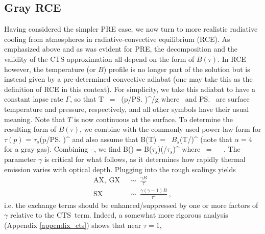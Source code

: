 \documentclass[10pt]{article}
\newcommand{\taus}{\ensuremath{\tau_s}}
\newcommand{\Bs}{\ensuremath{B_s}}
\newcommand{\SX}{\ensuremath{\mathrm{SX}}}
\newcommand{\AX}{\ensuremath{\mathrm{AX}}}
\newcommand{\GX}{\ensuremath{\mathrm{GX}}}
\newcommand{\CTS}{\ensuremath{\mathrm{CTS}}}
\begin{document}
\subsection{Gray RCE} \label{sec_rce_decomp_analysis}
Having considered the simpler PRE case, we now turn to more realistic radiative cooling from atmospheres in radiative-convective equilibrium (RCE). As emphasized above and as was evident for PRE, the decomposition  and the validity of the CTS approximation  all depend on the form of $B(\tau)$. In RCE however,  the temperature (or $B$) profile is no longer part of the solution but is instead given by a pre-determined convective adiabat (one may take this as the definition of RCE in this context). For simplicity, we take this adiabat to have a constant lapse rate $\Gamma$, so that  
\beqn
	T \ = \ \Ts(p/\ps)^{\Rd\Gamma/g} 
	\label{Tp}
\eeqn
where \Ts\ and \ps\ are surface temperature and pressure, respectively, and all other symbols have their usual meaning. Note that $T$ is now continuous at the surface. To determine the resulting form of  $B(\tau)$, we combine  with the commonly used power-law form for $\tau(p)$
 \beqn
 	\tau = \taus(p/\ps)^\beta 
	\label{taup}
\eeqn 
and also assume that  
\beqn
	B(T)\ = \ \Bs(T/\Ts)^\alpha
	\label{BT}
\eeqn
(note  that $\alpha=4$ for a gray gas). Combining --, we find
\beqn
	B(\tau) = B(\taus)(\tau/\taus)^\gamma
	\label{Btau1}
\eeqn
 where
  \beqn
 	\gamma \ = \  \ .
	\label{gamma_def}
\eeqn
The parameter $\gamma$ is critical for what follows, as it determines how rapidly thermal emission varies with optical depth. Plugging  into the rough scalings  yields
\begin{subequations}
	\begin{align}
		\AX, \ \GX	 \ & \ \sim \ \frac{\gamma B}{\tau}  \label{ax_gx_scaling}\\
		\SX	 \ & \ \sim \ \frac{\gamma(\gamma-1)B}{\tau^2}  \ , \label{sx_scaling} 
	\end{align}
	\label{cts_decomp_ders2}
\end{subequations}
i.e. the exchange terms should be enhanced/suppressed by one or more factors of $\gamma$ relative to the \CTS\ term. Indeed, a somewhat more rigorous analysis (Appendix \ref{appendix_cts}) shows that near $\tau=1$,
\end{document}

